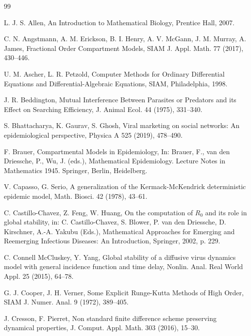 \documentclass[11pt]{article}
\theoremstyle{definition}
\theoremstyle{remark}
\numberwithin{equation}{section}
\begin{document}

\begin{thebibliography}{99}

L. J. S. Allen, 
An Introduction to Mathematical Biology, Prentice Hall,  2007.

C. N. Angstmann, A. M. Erickson, B. I. Henry, A. V. McGann, J. M. Murray,  A. James,
Fractional Order Compartment Models, 
SIAM J. Appl. Math. 77 (2017), 430--446.

U. M. Ascher, L. R. Petzold,
Computer Methods for Ordinary Differential Equations and Differential-Algebraic Equations, 
SIAM, Philadelphia, 1998.

J. R. Beddington, 
Mutual Interference Between Parasites or Predators and its Effect on Searching Efficiency, 
J. Animal Ecol. 44 (1975), 331--340.

S. Bhattacharya, K. Gaurav, S. Ghosh, 
Viral marketing on social networks: An epidemiological perspective, 
Physica A 525 (2019), 478--490.

F. Brauer, Compartmental Models in Epidemiology, 
In: Brauer, F., van den Driessche, P., Wu, J. (eds.), 
Mathematical Epidemiology. Lecture Notes in Mathematics 1945. 
Springer, Berlin, Heidelberg.

V. Capasso, G. Serio, 
A generalization of the Kermack-McKendrick deterministic epidemic model, 
Math. Biosci. 42 (1978), 43--61.

C. Castillo-Chavez, Z. Feng, W. Huang, On the computation of $R_0$ and its role in global stability, 
in: C. Castillo-Chavez, S. Blower, P. van den Driessche, D. Kirschner, A.-A. Yakubu (Eds.), 
Mathematical Approaches for Emerging and Reemerging Infectious Diseases: An Introduction, Springer, 2002, p. 229.

C. Connell McCluskey, Y. Yang, 
Global stability of a diffusive virus dynamics model with general incidence function and time delay, 
Nonlin. Anal. Real World Appl. 25 (2015), 64--78.

G. J. Cooper, J. H. Verner, 
Some Explicit Runge-Kutta Methods of High Order, 
SIAM J. Numer. Anal. 9 (1972), 389--405.

J. Cresson, F. Pierret, 
Non standard finite difference scheme preserving dynamical properties, 
J. Comput. Appl. Math. 303 (2016), 15--30.


\end{thebibliography}
\end{document}
